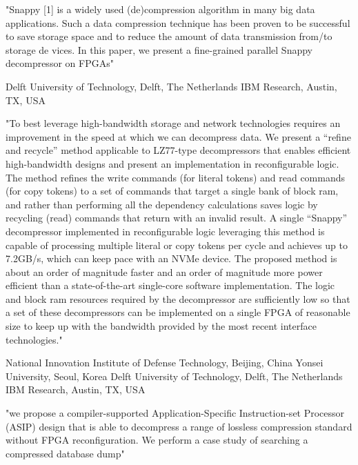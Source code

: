 \cite{Fang2019AModel}
"Snappy [1] is a widely used (de)compression algorithm in
many big data applications. Such a data compression technique
has been proven to be successful to save storage space and to
reduce the amount of data transmission from/to storage de
vices. In this paper, we present a fine-grained parallel Snappy
decompressor on FPGAs"

Delft University of Technology, Delft, The Netherlands
IBM Research, Austin, TX, USA

\cite{Fang2020AnLogic}
"To best leverage high-bandwidth storage and network technologies requires an improvement in the speed at which we can
decompress data. We present a “refine and recycle” method applicable to LZ77-type decompressors that enables efficient
high-bandwidth designs and present an implementation in reconfigurable logic. The method refines the write commands
(for literal tokens) and read commands (for copy tokens) to a set of commands that target a single bank of block ram, and
rather than performing all the dependency calculations saves logic by recycling (read) commands that return with an invalid
result. A single “Snappy” decompressor implemented in reconfigurable logic leveraging this method is capable of processing
multiple literal or copy tokens per cycle and achieves up to 7.2GB/s, which can keep pace with an NVMe device. The
proposed method is about an order of magnitude faster and an order of magnitude more power efficient than a state-of-the-art
single-core software implementation. The logic and block ram resources required by the decompressor are sufficiently low
so that a set of these decompressors can be implemented on a single FPGA of reasonable size to keep up with the bandwidth
provided by the most recent interface technologies."

National Innovation Institute of Defense Technology, Beijing, China
Yonsei University, Seoul, Korea
Delft University of Technology, Delft, The Netherlands
IBM Research, Austin, TX, USA

\cite{Hoozemans2021EnergyASIP}
"we propose a
compiler-supported Application-Specific Instruction-set Processor
(ASIP) design that is able to decompress a range of lossless compression
standard without FPGA reconfiguration. We perform a
case study of searching a compressed database dump"

